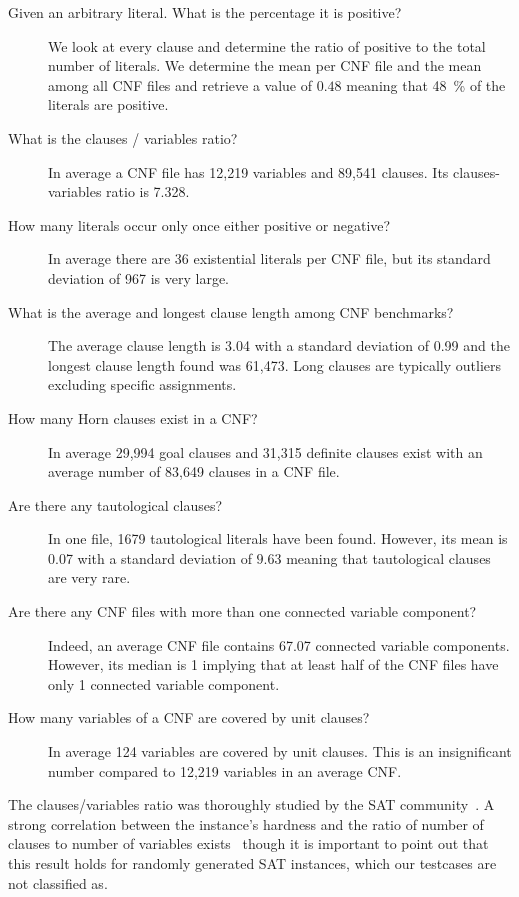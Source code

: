 \begin{description}
\item[Given an arbitrary literal. What is the percentage it is positive?]
  We look at every clause and determine the ratio of positive to the total number of literals.
  We determine the mean per CNF file and the mean among all CNF files
  and retrieve a value of $0.48$ meaning that 48~\% of the literals are positive.
\item[What is the clauses / variables ratio?]
  In average a CNF file has 12,219 variables and 89,541 clauses.
  Its clauses-variables ratio is 7.328.
\item[How many literals occur only once either positive or negative?]
  In average there are 36 existential literals per CNF file,
  but its standard deviation of 967 is very large.
\item[What is the average and longest clause length among CNF benchmarks?]
  The average clause length is 3.04 with a standard deviation of 0.99
  and the longest clause length found was 61,473. Long clauses are typically
  outliers excluding specific assignments.
\item[How many Horn clauses exist in a CNF?]
  In average 29,994 goal clauses and 31,315 definite clauses exist
  with an average number of 83,649 clauses in a CNF file.
\item[Are there any tautological clauses?]
  In one file, 1679 tautological literals have been found. However,
  its mean is 0.07 with a standard deviation of $9.63$ meaning that tautological
  clauses are very rare.
\item[Are there any CNF files with more than one connected variable component?]
  Indeed, an average CNF file contains 67.07 connected variable components.
  However, its median is 1 implying that at least half of the CNF files
  have only 1 connected variable component.
\item[How many variables of a CNF are covered by unit clauses?]
  In average 124 variables are covered by unit clauses. This is an insignificant
  number compared to 12,219 variables in an average CNF.
\end{description}

The clauses/variables ratio was thoroughly studied by the SAT
community~\cite{nudelman2004understanding}.
A strong correlation between the instance's hardness and the ratio of number
of clauses to number of variables exists~\cite{selman1996generating}
though it is important to point out that this result holds for randomly
generated SAT instances, which our testcases are not classified as.

